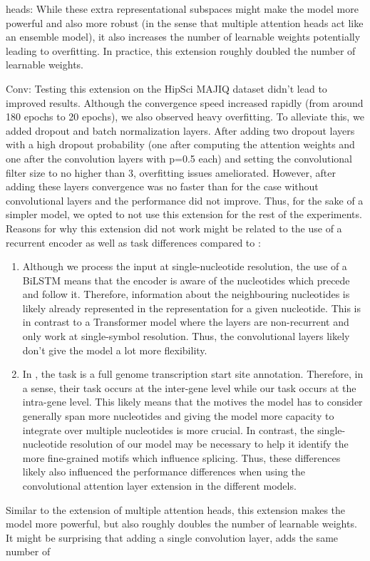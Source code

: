 heads:
While these extra representational subspaces might make the model more powerful and also more robust (in the sense that multiple attention heads act like an ensemble model), it also increases the number of learnable weights potentially leading to overfitting. In practice, this extension roughly doubled the number of learnable weights.

Conv: 
Testing this extension on the HipSci MAJIQ dataset didn't lead to improved results. Although the convergence speed increased rapidly (from around 180 epochs to 20 epochs), we also observed heavy overfitting. To alleviate this, we added dropout and batch normalization layers. After adding two dropout layers with a high dropout probability (one after computing the attention weights and one after the convolution layers with p=0.5 each) and setting the convolutional filter size to no higher than 3, overfitting issues ameliorated. However, after adding these layers convergence was no faster than for the case without convolutional layers and the performance did not improve. Thus, for the sake of a simpler model, we opted to not use this extension for the rest of the experiments.
Reasons for why this extension did not work might be related to the use of a recurrent encoder as well as task differences compared to \cite{ghentransformers}:
\begin{enumerate}
	\item Although we process the input at single-nucleotide resolution, the use of a BiLSTM means that the encoder is aware of the nucleotides which precede and follow it. Therefore, information about the neighbouring nucleotides is likely already represented in the representation for a given nucleotide. This is in contrast to a Transformer model where the layers are non-recurrent and only work at single-symbol resolution. Thus, the convolutional layers likely don't give the model a lot more flexibility.
	\item In \cite{ghentransformers}, the task is a full genome transcription start site annotation. Therefore, in a sense, their task occurs at the inter-gene level while our task occurs at the intra-gene level. This likely means that the motives the model has to consider generally span more nucleotides and giving the model more capacity to integrate over multiple nucleotides is more crucial. In contrast, the single-nucleotide resolution of our model may be necessary to help it identify the more fine-grained motifs which influence splicing. Thus, these differences likely also influenced the performance differences when using the convolutional attention layer extension in the different models.
\end{enumerate}


Similar to the extension of multiple attention heads, this extension makes the model more powerful, but also roughly doubles the number of learnable weights. It might be surprising that adding a single convolution layer, adds the same number of 
